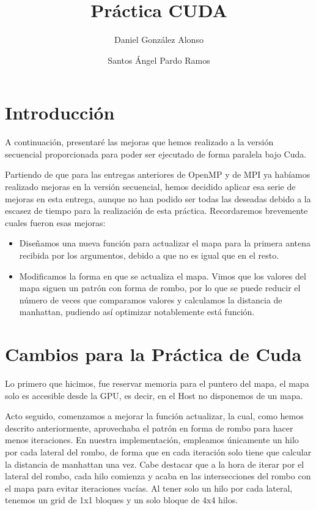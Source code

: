\documentclass[8pt]{article}
\begin{document}
%
\title{Práctica CUDA}
%

\author{Daniel González Alonso \and Santos Ángel Pardo Ramos}

\maketitle

\section{Introducción}
A continuación, presentaré las mejoras que hemos realizado a la versión secuencial proporcionada para poder ser ejecutado de forma paralela bajo Cuda.

Partiendo de que para las entregas anteriores de OpenMP y de MPI ya habíamos realizado mejoras en la versión secuencial, hemos decidido aplicar esa serie de mejoras en esta entrega, aunque no han podido ser todas las deseadas debido a la escasez de tiempo para la realización de esta práctica. Recordaremos brevemente cuales fueron esas mejoras:

\begin{itemize} 
  \item Diseñamos una nueva función para actualizar el mapa para la primera antena recibida por los argumentos, debido a que no es igual que en el resto.
  
  \item Modificamos la forma en que se actualiza el mapa. Vimos que los valores del mapa siguen un patrón con forma de rombo, por lo que se puede reducir el número de veces que comparamos valores y calculamos la distancia de manhattan, pudiendo así optimizar notablemente está función.
\end{itemize}
\section{Cambios para la Práctica de Cuda}


Lo primero que hicimos, fue reservar memoria para el puntero del mapa, el mapa solo es accesible desde la GPU, es decir, en el Host no disponemos de un mapa.

Acto seguido, comenzamos a mejorar la función actualizar, la cual, como hemos descrito anteriormente, aprovechaba el patrón en forma de rombo para hacer menos iteraciones. En nuestra implementación, empleamos únicamente un hilo por cada lateral del rombo, de forma que en cada iteración solo tiene que calcular la distancia de manhattan una vez. Cabe destacar que a la hora de iterar por el lateral del rombo, cada hilo comienza y acaba en las intersecciones del rombo con el mapa para evitar iteraciones vacías. Al tener solo un hilo por cada lateral, tenemos un grid de 1x1 bloques y un solo bloque de 4x4 hilos.
\end{document}
